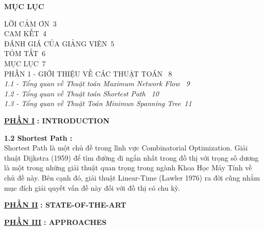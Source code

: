 \documentclass{article}
\begin{document}
\newpage
\newpage
	\begin{center}
		\fontsize{16pt}{22pt}\selectfont
		\textbf{MỤC LỤC}
	\end{center}
	\bigskip
	\begin{flushleft}
		\fontsize{16pt}{22pt}\selectfont
		LỜI CẢM ƠN\dotfill\ 3\\
		\smallskip
		CAM KẾT\dotfill\ 4\\
		\smallskip
		ĐÁNH GIÁ CỦA GIẢNG VIÊN\dotfill\ 5\\
		\smallskip
		TÓM TẮT\dotfill\ 6\\
		\smallskip
		MỤC LỤC\dotfill\ 7\\
		\smallskip
		PHẦN 1 - GIỚI THIỆU VỀ CÁC THUẬT TOÁN \dotfill\ 8\\
		\smallskip
		\fontsize{14pt}{22pt}\selectfont
		\hspace{0.86cm}\textit{1.1 - Tổng quan về Thuật toán Maximum Network Flow \dotfill\ 9\\
		\hspace{0.86cm}1.2 - Tổng quan về Thuật toán Shortest Path  \dotfill\ 10\\
		\hspace{0.86cm}1.3 - Tổng quan về Thuật Toán Minimun Spanning Tree\dotfill\ 11\\}
	\end{flushleft}
\newpage
	\begin{center}
		\fontsize{16pt}{22pt}\selectfont
		\underline{\textbf{PHẦN I}}
		\textbf{: INTRODUCTION}
	\end{center}
	\begin{flushleft}
		\fontsize{14pt}{22pt}\selectfont
		\textbf{1.2 Shortest Path :}\\
		\hspace{0.86cm}Shortest Path là một chủ đề trong lĩnh vực Combinatorial Optimization. Giải thuật Dijkstra (1959) để tìm đường đi ngắn nhất trong đồ thị với trọng số dương là một trong những giải thuật quan trọng trong ngành Khoa Học Máy Tính về chủ đề này. Bên cạnh đó, giải thuật Linear-Time (Lawler 1976) ra đời cũng nhằm mục đích giải quyết vấn đề này đối với đồ thị có chu kỳ. 
	\end{flushleft}
	\bigskip
\newpage
	\begin{center}
		\fontsize{16pt}{22pt}\selectfont
		\underline{\textbf{PHẦN II}}
		\textbf{: STATE-OF-THE-ART}
	\end{center}
\newpage
	\begin{center}
		\fontsize{16pt}{22pt}\selectfont
		\underline{\textbf{PHẦN III}}
		\textbf{: APPROACHES}\\
		\bigskip
	\end{center}
\end{document}
